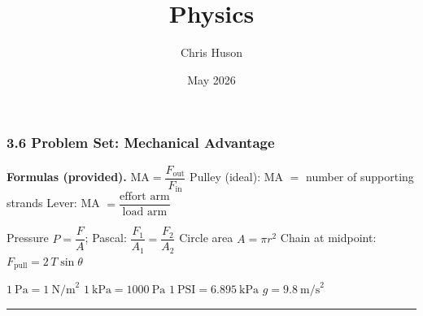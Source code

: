 \documentclass[12pt, twoside]{article}
\title{Physics}
\author{Chris Huson}
\date{May 2026}
\begin{document}
\subsubsection*{3.6 Problem Set: Mechanical Advantage}

\textbf{Formulas (provided).} \quad
$\text{MA} = \dfrac{F_\text{out}}{F_\text{in}}$ \qquad
Pulley (ideal): MA $=$ number of supporting strands \qquad
Lever: MA $= \dfrac{\text{effort arm}}{\text{load arm}}$

\smallskip
Pressure $P=\dfrac{F}{A}$; \; Pascal: $\dfrac{F_1}{A_1}=\dfrac{F_2}{A_2}$ \qquad
Circle area $A=\pi r^2$ \qquad
Chain at midpoint: $F_\text{pull}=2\,T\sin\theta$

\smallskip
$1~\text{Pa}=1~\text{N/m}^2$ \quad $1~\text{kPa}=1000~\text{Pa}$ \quad $1~\text{PSI}=6.895~\text{kPa}$ \quad $g=9.8~\text{m/s}^2$

\hrule
\vspace{0.3cm}
\end{document}
